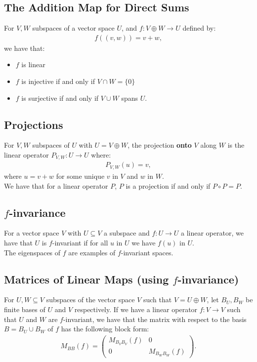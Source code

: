 \documentclass[a4paper, 12pt, twoside]{article}
\begin{document}
\newpage

\subsection{The Addition Map for Direct Sums}

For $V, W$ subspaces of a vector space $U$, and $f : V \oplus W \to U$
defined by: \begin{gather*}
  f((v, w)) = v + w,
\end{gather*} we have that: \begin{itemize}
  \item $f$ is linear
  \item $f$ is injective if and only if $V \cap W = \{0\}$
  \item $f$ is surjective if and only if $V \cup W$ spans $U$.
\end{itemize}

\subsection{Projections}

For $V, W$ subspaces of $U$ with $U = V \oplus W$, the projection
\textbf{onto} $V$ along $W$ is the linear operator $P_{V, W} : U \to U$
where: \begin{gather*}
  P_{V, W}(u) = v,
\end{gather*} where $u = v + w$ for some unique $v$ in $V$ and
$w$ in $W$.
\\[\baselineskip]
We have that for a linear operator $P$, $P$ is a projection if
and only if $P \circ P = P$.

\subsection{$f$-invariance}

For a vector space $V$ with $U \subseteq V$ a subspace and 
$f : U \to U$ a linear operator, we have that $U$ is $f$-invariant
if for all $u$ in $U$ we have $f(u)$ in $U$.
\\[\baselineskip]
The eigenspaces of $f$ are examples of $f$-invariant spaces.

\subsection{Matrices of Linear Maps (using $f$-invariance)}

For $U, W \subseteq V$ subspaces of the vector space $V$ such that
$V = U \oplus W$, let $B_U, B_W$ be finite bases of $U$ and $V$
respectively. If we have a linear operator $f : V \to V$ such that
$U$ and $W$ are $f$-invariant, we have that the matrix with respect
to the basis $B = B_U \cup B_W$ of $f$ has the following block form:
\begin{gather*}
  M_{BB}(f) = \begin{pmatrix}
    M_{B_VB_V}(f) & 0 \\
    0 & M_{B_WB_W}(f)
  \end{pmatrix}.
\end{gather*}
 
\end{document}
